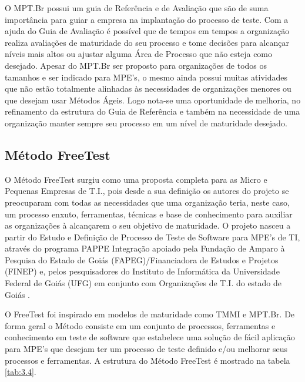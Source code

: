 O MPT.Br possui um guia de Referência e de Avaliação que são de suma importância para guiar a empresa na implantação do processo de teste. Com a ajuda do Guia de Avaliação é possível que de tempos em tempos a organização realiza avaliações de maturidade do seu processo e tome decisões para alcançar níveis mais altos ou ajustar alguma Área de Processo que não esteja como desejado. Apesar do MPT.Br ser proposto para organizações de todos os tamanhos e ser indicado para MPE's, o mesmo ainda possui muitas atividades que não estão totalmente alinhadas às necessidades de organizações menores ou que desejam usar Métodos Ágeis. Logo nota-se uma oportunidade de melhoria, no refinamento da estrutura do Guia de Referência e também na necessidade de uma organização manter sempre seu processo em um nível de maturidade desejado.

\subsection{Método FreeTest}
\label{freetest}

O Método FreeTest \cite{Camilo-junior2012} surgiu como uma proposta completa para as Micro e Pequenas Empresas de T.I., pois desde a sua definição os autores do projeto se preocuparam com todas as necessidades que uma organização teria, neste caso, um processo enxuto, ferramentas, técnicas e base de conhecimento para auxiliar as organizações à alcançarem o seu objetivo de maturidade. O projeto nasceu a partir do Estudo e Definição de Processo de Teste de Software para MPE's de TI, através do programa PAPPE Integração apoiado pela Fundação de Amparo à Pesquisa do Estado de Goiás (FAPEG)/Financiadora de Estudos e Projetos (FINEP) e, pelos pesquisadores do Instituto de Informática da Universidade Federal de Goiás (UFG) em conjunto com Organizações de T.I. do estado de Goiás \cite{Camilo-junior2012a}.

O FreeTest foi inspirado em modelos de maturidade como TMMI e MPT.Br. De forma geral o Método consiste em um conjunto de processos, ferramentas e conhecimento em teste de software que estabelece uma solução de fácil aplicação para MPE's que desejam ter um processo de teste definido e/ou melhorar seus processos e ferramentas. A estrutura do Método FreeTest é mostrado na tabela \ref{tab:3.4}.



